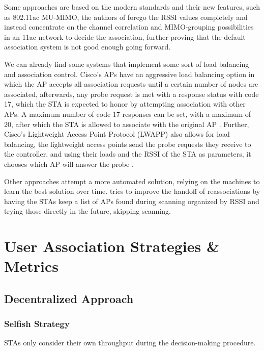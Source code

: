 \documentclass{article}
\begin{document}
	Some approaches are based on the modern standards and their new features, such as 802.11ac MU-MIMO, the authors of \cite{mimo2017} forego the RSSI values completely and instead concentrate on the channel correlation and MIMO-grouping possibilities in an 11ac network to decide the association, further proving that the default association system is not good enough going forward.
	
We can already find some systems that implement some sort of load balancing and association control. Cisco's APs have an aggressive load balancing option in which the AP accepts all association requests until a certain number of nodes are associated, afterwards, any probe request is met with a response status with code 17, which the STA is expected to honor by attempting association with other APs. A maximum number of code 17 responses can be set, with a maximum of 20, after which the STA is allowed to associate with the original AP \cite{cisco2017}. Further, Cisco's Lightweight Access Point Protocol (LWAPP) also allows for load balancing, the lightweight access points send the probe requests they receive to the controller, and using their loads and the RSSI of the STA as parameters, it chooses which AP will answer the probe \cite{cisco2006}.

Other approaches attempt a more automated solution, relying on the machines to learn the best solution over time. \cite{shin2004} tries to improve the handoff of reassociations by having the STAs keep a list of APs found during scanning organized by RSSI and trying those directly in the future, skipping scanning.
	
	
	
	
\section{User Association Strategies \& Metrics}
\label{section:strategies}

	\subsection{Decentralized Approach}
	\label{section:decentralized}
	
		\subsubsection{Selfish Strategy}
		\label{section:selfish}
			STAs only consider their own throughput during the decision-making procedure.
			
\end{document}

